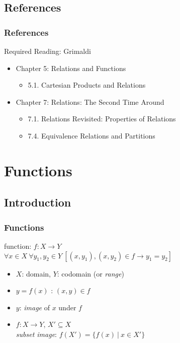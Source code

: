 \documentclass[dvipsnames]{beamer}
\begin{document}
\subsection*{References}

\begin{frame}
  \frametitle{References}

  \begin{block}{Required Reading: Grimaldi}
    \begin{itemize}
      \item Chapter 5: Relations and Functions
      \begin{itemize}
        \item 5.1. \alert{Cartesian Products and Relations}
      \end{itemize}
      \item Chapter 7: Relations: The Second Time Around
      \begin{itemize}
        \item 7.1. \alert{Relations Revisited: Properties of Relations}
        \item 7.4. \alert{Equivalence Relations and Partitions}
      \end{itemize}
    \end{itemize}
  \end{block}
\end{frame}

\section{Functions}

\subsection{Introduction}

\begin{frame}
  \frametitle{Functions}

  \begin{definition}
    \alert{function}: $f: X \rightarrow Y$\\
    $\forall x \in X~\forall y_1,y_2 \in Y~
      [(x,y_1),(x,y_2) \in f \rightarrow y_1=y_2]$
  \end{definition}

  \medskip
  \begin{itemize}
    \item $X$: \alert{domain}, $Y$: \alert{codomain} (or \emph{range})

    \pause
    \medskip
    \item $y = f(x)$ \hspace{1em} : \hspace{1em} $(x,y) \in f$
    \item $y$: \emph{image} of $x$ under $f$

    \pause
    \medskip
    \item $f: X \rightarrow Y$, $X' \subseteq X$\\
      \emph{subset image}: $f(X') = \{f(x)~|~x \in X'\}$
 \end{itemize}
\end{frame}
\end{document}
